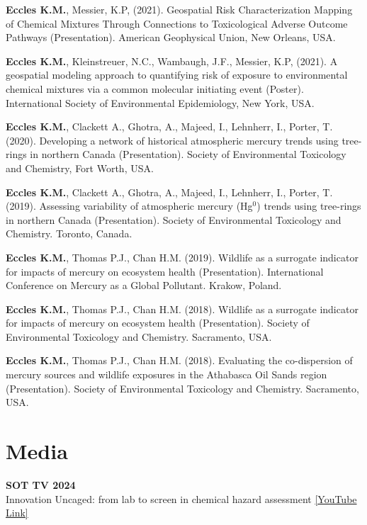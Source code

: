 \documentclass[margin,line]{res}
\begin{document}
\begin{resume}
\textbf{Eccles K.M.}, Messier, K.P, (2021). Geospatial Risk Characterization Mapping of Chemical Mixtures Through Connections to Toxicological Adverse Outcome Pathways (Presentation). American Geophysical Union, New Orleans, USA.

\textbf{Eccles K.M.}, Kleinstreuer, N.C., Wambaugh, J.F., Messier, K.P, (2021). A geospatial modeling approach to quantifying risk of exposure to environmental chemical mixtures via a common molecular initiating event (Poster). International Society of Environmental Epidemiology, New York, USA.

\textbf{Eccles K.M.}, Clackett A., Ghotra, A., Majeed, I., Lehnherr, I., Porter, T. (2020). Developing a network of historical atmospheric mercury trends using tree-rings in northern Canada (Presentation).  Society of Environmental Toxicology and Chemistry, Fort Worth, USA.

\textbf{Eccles K.M.}, Clackett A., Ghotra, A., Majeed, I., Lehnherr, I., Porter, T. (2019). Assessing variability of atmospheric mercury (Hg$^{0}$) trends using tree-rings in northern Canada (Presentation). Society of Environmental Toxicology and Chemistry. Toronto, Canada.

\textbf{Eccles K.M.}, Thomas P.J., Chan H.M. (2019). Wildlife as a surrogate indicator for impacts of mercury on ecosystem health (Presentation). International Conference on Mercury as a Global Pollutant. Krakow, Poland.

\textbf{Eccles K.M.}, Thomas P.J., Chan H.M. (2018). Wildlife as a surrogate indicator for impacts of mercury on ecosystem health (Presentation). Society of Environmental Toxicology and Chemistry. Sacramento, USA.

\textbf{Eccles K.M.}, Thomas P.J., Chan H.M. (2018). Evaluating the co-dispersion of mercury sources and wildlife exposures in the Athabasca Oil Sands region (Presentation). Society of Environmental Toxicology and Chemistry. Sacramento, USA.


\vspace*{.1in}
\section{\sc Media}
\textbf{SOT TV 2024}\\
Innovation Uncaged: from lab to screen in chemical hazard assessment \href{https://www.youtube.com/watch?v=6Pg7DvoHgP0}{[YouTube Link]}


\end{resume}
\end{document}

